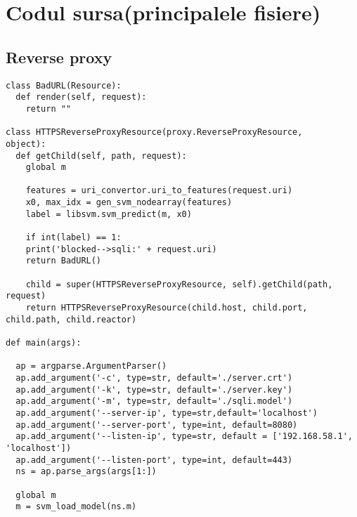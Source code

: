 \appendix


\chapter{Codul sursa(principalele fisiere)}
\section{Reverse proxy}

\begin{lstlisting}[style=PythonStyle]
class BadURL(Resource):
  def render(self, request):
    return ""

class HTTPSReverseProxyResource(proxy.ReverseProxyResource,                              object):
  def getChild(self, path, request):
    global m

    features = uri_convertor.uri_to_features(request.uri)
    x0, max_idx = gen_svm_nodearray(features)
    label = libsvm.svm_predict(m, x0)

    if int(label) == 1:
    print('blocked-->sqli:' + request.uri)
    return BadURL()

    child = super(HTTPSReverseProxyResource, self).getChild(path, request)
    return HTTPSReverseProxyResource(child.host, child.port, child.path, child.reactor)

def main(args):

  ap = argparse.ArgumentParser()
  ap.add_argument('-c', type=str, default='./server.crt')
  ap.add_argument('-k', type=str, default='./server.key')
  ap.add_argument('-m', type=str, default='./sqli.model')
  ap.add_argument('--server-ip', type=str,default='localhost')
  ap.add_argument('--server-port', type=int, default=8080)
  ap.add_argument('--listen-ip', type=str, default = ['192.168.58.1', 'localhost'])
  ap.add_argument('--listen-port', type=int, default=443)
  ns = ap.parse_args(args[1:])

  global m
  m = svm_load_model(ns.m)


\end{lstlisting}
